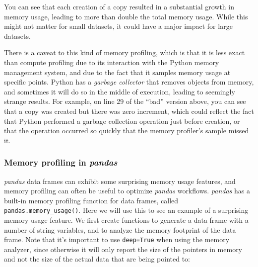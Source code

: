 You can see that each creation of a copy resulted in a substantial growth in memory usage, leading to more than double the total memory usage. While this might not matter for small datasets, it could have a major impact for large datasets.

There is a caveat to this kind of memory profiling, which is that it is less exact than compute profiling due to its interaction with the Python memory management system, and due to the fact that it samples memory usage at specific points.  Python has a \textit{garbage collector} that removes objects from memory, and sometimes it will do so in the middle of execution, leading to seemingly strange results.  For example, on line 29 of the ``bad'' version above, you can see that a copy was created but there was zero increment, which could reflect the fact that Python performed a garbage collection operation just before creation, or that the operation occurred so quickly that the memory profiler's sample missed it.

\subsubsection{Memory profiling in \textit{pandas}}

\textit{pandas} data frames can exhibit some surprising memory usage features, and memory profiling can often be useful to optimize \textit{pandas} workflows.  \textit{pandas} has a built-in memory profiling function for data frames, called \texttt{pandas.memory\_usage()}.  Here we will use this to see an example of a surprising memory usage feature.  We first create functions to generate a data frame with a number of string variables, and to analyze the memory footprint of the data frame. Note that it's important to use \texttt{deep=True} when using the memory analyzer, since otherwise it will only report the size of the pointers in memory and not the size of the actual data that are being pointed to:

